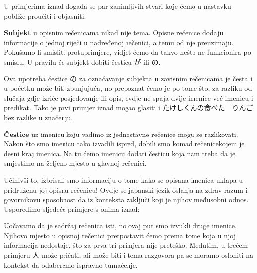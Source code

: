	U primjerima iznad događa se par zanimljivih stvari koje ćemo u nastavku pobliže proučiti i objasniti.
	
	\vspace{5pt}
	\textbf{Subjekt} u opisnim rečenicama nikad nije tema. Opisne rečenice dodaju informacije o jednoj riječi u nadređenoj rečenici, a temu od nje preuzimaju. Pokušamo li smisliti protuprimjere, vidjet ćemo da takvo nešto ne funkcionira po smislu. U pravilu će subjekt dobiti česticu が ili の.
	
	Ova upotreba čestice の za označavanje subjekta u zavisnim rečenicama je česta i u početku može biti zbunjujuća, no prepoznat ćemo je po tome što, za razliku od slučaja gdje izriče posjedovanje ili opis, ovdje ne spaja dvije imenice već imenicu i predikat. Tako je prvi primjer iznad mogao glasiti i たけしくん\underline{の}食べた　りんご bez razlike u značenju.
	
	\vspace{5pt}
	\textbf{Čestice} uz imenicu koju vadimo iz jednostavne rečenice mogu se razlikovati. Nakon što smo imenicu tako izvadili ispred, dobili smo komad rečenice\footnotemark[5] kojem je desni kraj imenica. Na tu ćemo imenicu dodati česticu koja nam treba da je smjestimo na željeno mjesto u glavnoj rečenici.
	
	
	Učinivši to, izbrisali smo informaciju o tome kako se opisana imenica uklapa u pridruženu joj opisnu rečenicu! Ovdje se japanski jezik oslanja na zdrav razum i govornikovu sposobnost da iz konteksta zaključi koji je njihov međusobni odnos. Usporedimo sljedeće primjere s onima iznad:
	
	\begin{reibun}
	\end{reibun}

	Uočavamo da je sadržaj rečenica isti, no ovaj put smo izvukli druge imenice. Njihovo mjesto u opisnoj rečenici pretpostavit ćemo prema tome koja u njoj informacija nedostaje, što za prva tri primjera nije preteško. Međutim, u trećem primjeru 人 može pričati, ali može biti i tema razgovora pa se moramo osloniti na kontekst da odaberemo ispravno tumačenje.
	
